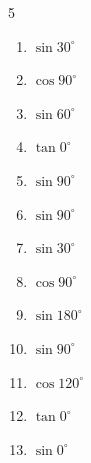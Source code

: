 \begin{multicols}{5}
\begin{enumerate}

  \item $\displaystyle \sin{30^\circ}$


  \item $\displaystyle \cos{90^\circ}$

        \phantom{$\displaystyle =0$}

  \item $\displaystyle \sin{60^\circ}$


  \item $\displaystyle \tan{0^\circ}$

        \phantom{$\displaystyle =0$}

  \item $\displaystyle \sin{90^\circ}$

        \phantom{$\displaystyle =1$}

\columnbreak %

  \item $\displaystyle \sin{90^\circ}$

        \phantom{$\displaystyle =1$}

  \item $\displaystyle \sin{30^\circ}$


  \item $\displaystyle \cos{90^\circ}$

        \phantom{$\displaystyle =0$}

  \item $\displaystyle \sin{180^\circ}$

        \phantom{$\displaystyle =0$}

  \item $\displaystyle \sin{90^\circ}$

        \phantom{$\displaystyle =1$}

  \item $\displaystyle \cos{120^\circ}$


  \item $\displaystyle \tan{0^\circ}$

        \phantom{$\displaystyle =0$}

  \item $\displaystyle \sin{0^\circ}$


\end{enumerate}
\end{multicols}
